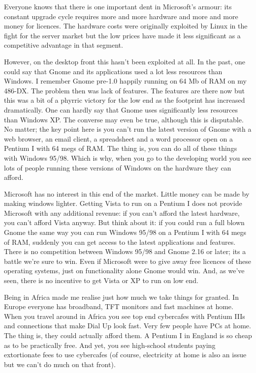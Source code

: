 \documentclass{book}
\begin{document}
Everyone knows that there is one important dent in Microsoft's armour:
its constant upgrade cycle requires more and more hardware and more
and more money for licences. The hardware costs were originally
exploited by Linux in the fight for the server market but the low
prices have made it less significant as a competitive advantage in
that segment.

However, on the desktop front this hasn't been exploited at all. In
the past, one could say that Gnome and its applications used a lot
less resources than Windows. I remember Gnome pre-1.0 happily running
on 64 Mb of RAM on my 486-DX. The problem then was lack of
features. The features are there now but this was a bit of a phyrric
victory for the low end as the footprint has increased
dramatically. One can hardly say that Gnome uses significantly less
resources than Windows XP. The converse may even be true, although
this is disputable. No matter; the key point here is you can't run the
latest version of Gnome with a web browser, an email client, a
spreadsheet and a word processor open on a Pentium I with 64 megs of
RAM. The thing is, you can do all of these things with Windows
95/98. Which is why, when you go to the developing world you see lots
of people running these versions of Windows on the hardware they can
afford.

Microsoft has no interest in this end of the market. Little money can
be made by making windows lighter. Getting Vista to run on a Pentium I
does not provide Microsoft with any additional revenue: if you can't
afford the latest hardware, you can't afford Vista anyway. But think
about it: if you could run a full blown Gnome the same way you can run
Windows 95/98 on a Pentium I with 64 megs of RAM, suddenly you can get
access to the latest applications and features. There is no
competition between Windows 95/98 and Gnome 2.16 or later; its a
battle we're sure to win. Even if Microsoft were to give away free
licences of these operating systems, just on functionality alone Gnome
would win. And, as we've seen, there is no incentive to get Vista or
XP to run on low end.

Being in Africa made me realise just how much we take things for
granted. In Europe everyone has broadband, TFT monitors and fast
machines at home. When you travel around in Africa you see top end
cybercafes with Pentium IIIs and connections that make Dial Up look
fast. Very few people have PCs at home. The thing is, they could
actually afford them. A Pentium I in England is so cheap as to be
practically free. And yet, you see high-school students paying
extortionate fees to use cybercafes (of course, electricity at home is
also an issue but we can't do much on that front).
\end{document}
